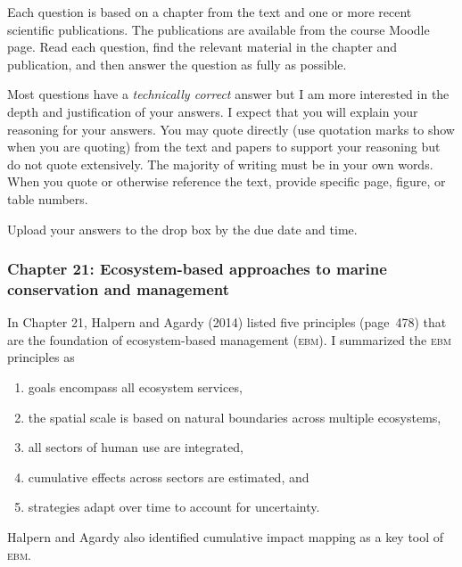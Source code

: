 \documentclass[12pt, addpoints]{exam}
\begin{document}
Each question is based on a chapter from the text and one or more recent scientific publications. 
The publications are available from the course Moodle page. Read each question, find the 
relevant material in the chapter and publication, and then answer the question as fully
as possible.

Most questions have a \emph{technically correct} answer but I am more interested in
the depth and justification of your answers. I expect that you will explain your reasoning 
for your answers. You may quote directly (use quotation marks to  show when you are quoting) from the text and papers to 
support your reasoning but do not quote extensively. The majority of writing must be in
your own words. When you quote or otherwise reference the text, provide specific page, figure, or table numbers.

Upload your answers to the drop box by the due date and time.

\subsubsection*{Chapter 21: Ecosystem-based approaches to marine conservation and management}

In Chapter 21, Halpern and Agardy (2014) listed five principles (page~478) that are 
the foundation of ecosystem-based management (\textsc{ebm}). I summarized 
the \textsc{ebm} principles as

\begin{enumerate}[label=\textsc{\alph*}.]
\item goals encompass all ecosystem services,
\item the spatial scale is based on natural boundaries across multiple ecosystems,
\item all sectors of human use are integrated,
\item cumulative effects across sectors are estimated, and
\item strategies adapt over time to account for uncertainty.
\end{enumerate}

Halpern and Agardy also identified cumulative impact mapping as a key tool of \textsc{ebm.}
\end{document}
